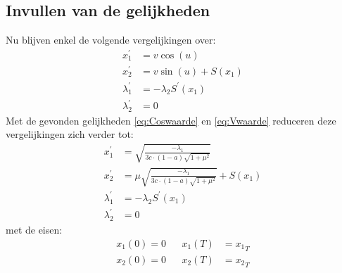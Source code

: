 \subsection{Invullen van de gelijkheden}
Nu blijven enkel de volgende vergelijkingen over:
\begin{align*}
	x_1^\prime &= v \cos(u)\\
	x_2^\prime &= v \sin(u) + S(x_1)\\
	\lambda_1^\prime &= -\lambda_2 S^\prime(x_1)\\
	\lambda_2^\prime &= 0
\end{align*}
Met de gevonden gelijkheden \eqref{eq:Coswaarde} en \eqref{eq:Vwaarde} reduceren deze vergelijkingen zich verder tot:
\begin{align}
	x_1^\prime &= \sqrt{\frac{-\lambda_1}{3c\cdot(1-a)\sqrt{1+\mu^2}}} \\
	x_2^\prime &= \mu \sqrt{\frac{-\lambda_1}{3c \cdot (1-a)\sqrt{1+\mu^2}}} +S(x_1) \\
	\lambda_1^\prime &= -\lambda_2 S^\prime(x_1)\\
	\lambda_2^\prime &= 0
\end{align}
met de eisen:
\begin{align*}
	x_1(0) = 0 && x_1(T) &= {x_1}_T\\
	x_2(0) = 0  && x_2(T) &= {x_2}_T
\end{align*}

